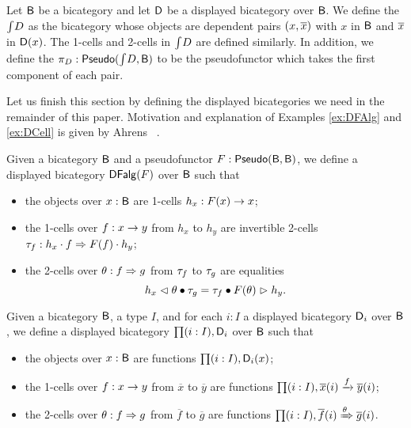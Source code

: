 \begin{definition}
\label{def:totalbicat}
Let $\B$ be a bicategory and let $\D$ be a displayed bicategory over $\B$.
We define the  $\total{D}$ as the bicategory whose objects are dependent pairs $(x, \xx)$ with $x$ in $\B$ and $\xx$ in $\dob{\D}{x}$.
The 1-cells and 2-cells in $\total{D}$ are defined similarly.
In addition, we define the  $\dproj{D} : \pseudo(\total{D}, \B)$ to be the pseudofunctor which takes the first component of each pair.
\end{definition}

Let us finish this section by defining the displayed bicategories we need in the remainder of this paper.
Motivation and explanation of Examples \ref{ex:DFAlg} and \ref{ex:DCell} is given by Ahrens \etal \ \cite{bicatjournal}.

\begin{example}
\label{ex:DFAlg}
Given a bicategory $\B$ and a pseudofunctor $F : \pseudo(\B, \B)$,
we define a displayed bicategory $\DFAlg(F)$ over $\B$ such that
\begin{itemize}
	\item the objects over $x : \B$ are 1-cells $h_x : F(x) \onecell x$;
	\item the 1-cells over $f : x \onecell y$ from $h_x$ to $h_y$ are invertible 2-cells $\tcC_f : h_x \cdot f \twocell F(f) \cdot h_y$;
	\item the 2-cells over $\tc : f \twocell g$ from $\tcC_f$ to $\tcC_g$ are equalities
	\begin{equation*}\label{eq:twocell_alg}
	h_x \whiskerl \tc \vcomp \tcC_g = \tcC_f \vcomp F(\tc) \whiskerr h_y.
	\end{equation*}
\end{itemize}
\end{example}

\begin{example}
\label{ex:disp_depprod}
Given a bicategory $\B$, a type $I$, and for each $i : I$ a displayed bicategory $\D_i$ over $\B$,
we define a displayed bicategory $\depprod{(i : I)}{\D_i}$ over $\B$ such that
\begin{itemize}
	\item the objects over $x : \B$ are functions $\depprod{(i : I)}{\D_i(x)}$;
	\item the 1-cells over $f : x \onecell y$ from $\overline{x}$ to $\overline{y}$ are functions $\depprod{(i : I)}{\dmor{\overline{x}(i)}{\overline{y}(i)}{f}}$;
	\item the 2-cells over $\tc : f \twocell g$ from $\overline{f}$ to $\overline{g}$ are functions $\depprod{(i : I)}{\dtwo{\overline{f}(i)}{\overline{g}(i)}{\tc}}$.
\end{itemize}
\end{example}

